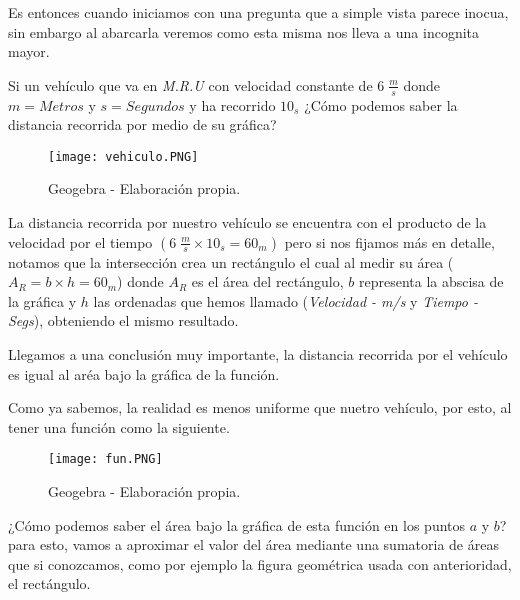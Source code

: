 \documentclass[twocolumn]{article}
\begin{document}
   Es entonces cuando iniciamos con una pregunta que a simple vista parece inocua, sin embargo al abarcarla veremos como esta misma nos lleva a una incognita mayor.

  \begin{justify}
   Si un vehículo que va en \textit{M.R.U} con velocidad constante de \(6 \; \frac{m}{s}\) donde \(m = Metros\) y \(s= Segundos\) y ha recorrido \(10_s\) ¿Cómo podemos saber la distancia recorrida por medio de su gráfica?
   
  \end{justify}

  \begin{figure}[H]
    \centering
    \texttt{[image: vehiculo.PNG]}
    \caption{Geogebra -  Elaboración propia.}
\end{figure}

  \begin{justify}
   La distancia recorrida por nuestro vehículo se encuentra con el producto de la velocidad por el tiempo \((6\;\frac{m}{s} \times 10_s = 60_m)\) pero si nos fijamos más en detalle, notamos que la intersección crea un rectángulo 
   el cual al medir su área (\( A_R = b \times h = 60_m\)) donde \(A_R\) es el área del rectángulo, \(b\) representa la abscisa de la gráfica y \(h\) las ordenadas que hemos llamado (\textit{Velocidad - m/s} y \textit{Tiempo - Segs}), obteniendo el mismo resultado. 
  \end{justify}
 
  \begin{justify}
    Llegamos a una conclusión muy importante, la distancia recorrida por el vehículo es igual al aréa bajo la gráfica de la función.
  \end{justify} 
   
   \begin{justify}
    Como ya sabemos, la realidad es menos uniforme que nuetro vehículo, por esto, al tener una función como la siguiente.
   \end{justify}
   
   \begin{figure}[H]
    \centering
    \texttt{[image: fun.PNG]}
    \caption{Geogebra - Elaboración propia.}
\end{figure}

   \begin{justify}
    ¿Cómo podemos saber el área bajo la gráfica de esta función en los puntos \(a\) y \(b\)? para esto, vamos a aproximar el valor del área mediante una sumatoria de áreas que si conozcamos, como por ejemplo la figura geométrica usada con anterioridad, el rectángulo.
    
\end{justify}
\end{document}
